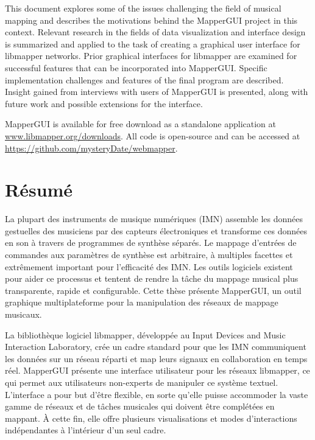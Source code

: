 \documentclass [12pt, letterpaper]{report}
\begin{document}
This document explores some of the issues challenging the field of musical mapping and describes the motivations behind the MapperGUI project in this context. Relevant research in the fields of data visualization and interface design is summarized and applied to the task of creating a graphical user interface for libmapper networks. Prior graphical interfaces for libmapper are examined for successful features that can be incorporated into MapperGUI. Specific implementation challenges and features of the final program are described. Insight gained from interviews with users of MapperGUI is presented, along with future work and possible extensions for the interface.

MapperGUI is available for free download as a standalone application at \url{www.libmapper.org/downloads}. All code is open-source and can be accessed at \url{https://github.com/mysteryDate/webmapper}.

\newpage

\section*{\centering R\'esum\'e}

La plupart des instruments de musique num\'eriques (IMN) assemble les donn\'ees gestuelles des musiciens par des capteurs \'electroniques et transforme ces donn\'ees en son \`a travers de programmes de synth\`ese s\'epar\'es.
Le mappage d'entr\'ees de commandes aux param\`etres de synth\`ese est arbitraire, \`a multiples facettes et extr\^emement important pour l'efficacit\'e des IMN.
Les outils logiciels existent pour aider ce processus et tentent de rendre la t\^ache du mappage musical plus transparente, rapide et configurable.
Cette th\`ese pr\'esente MapperGUI, un outil graphique multiplateforme pour la manipulation des r\'eseaux de mappage musicaux.

La biblioth\`eque logiciel libmapper, d\'evelopp\'ee au Input Devices and Music Interaction Laboratory, cr\'ee un cadre standard pour que les IMN communiquent les donn\'ees sur un r\'eseau r\'eparti et map leurs signaux en collaboration en temps r\'eel.
MapperGUI pr\'esente une interface utilisateur pour les r\'eseaux libmapper, ce qui permet aux utilisateurs non-experts de manipuler ce syst\`eme textuel.
L'interface a pour but d'\^etre flexible, en sorte qu'elle puisse accommoder la vaste gamme de r\'eseaux et de t\^aches musicales qui doivent \^etre compl\'et\'ees en mappant.
\`A cette fin, elle offre plusieurs visualisations et modes d'interactions ind\'ependantes \`a l'int\'erieur d'un seul cadre.    
\end{document}
